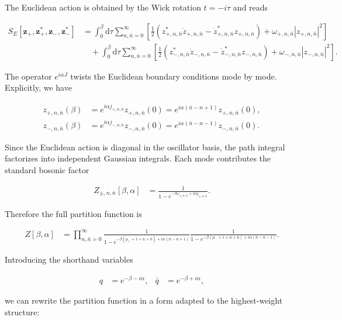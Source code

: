 The Euclidean action is obtained by the Wick rotation $t=-i\tau$ and reads

\begin{align}
S_{E}[\boldsymbol{z}_{+},\boldsymbol{z}^{*}_{+},\boldsymbol{z}_{-},\boldsymbol{z}^{*}_{-}] & =\int ^{\beta}_{0}\mathrm{d}\tau \sum ^{\infty}_{n,\bar{n}=0}\left[\frac{1}{2}\left(z^{*}_{+,n,\bar{n}}\dot{z}_{+,n,\bar{n}}-\dot{z}^{*}_{+,n,\bar{n}}z_{+,n,\bar{n}}\right)+\omega _{+,n,\bar{n}}|z_{+,n,\bar{n}}|^{2}\right] \\
& \quad +\int ^{\beta}_{0}\mathrm{d}\tau \sum ^{\infty}_{n,\bar{n}=0}\left[\frac{1}{2}\left(z^{*}_{-,n,\bar{n}}\dot{z}_{-,n,\bar{n}}-\dot{z}^{*}_{-,n,\bar{n}}z_{-,n,\bar{n}}\right)+\omega _{-,n,\bar{n}}|z_{-,n,\bar{n}}|^{2}\right].
\end{align}

The operator $e^{i\alpha J}$ twists the Euclidean boundary conditions mode by mode. Explicitly, we have

\begin{align}
z_{+,n,\bar{n}}(\beta) & =e^{i\alpha j_{+,n,\bar{n}}}z_{+,n,\bar{n}}(0)=e^{i\alpha (\bar{n}-n+1)}z_{+,n,\bar{n}}(0), \\
z_{-,n,\bar{n}}(\beta) & =e^{i\alpha j_{-,n,\bar{n}}}z_{-,n,\bar{n}}(0)=e^{i\alpha (\bar{n}-n-1)}z_{-,n,\bar{n}}(0).
\end{align}

Since the Euclidean action is diagonal in the oscillator basis, the path integral factorizes into independent Gaussian integrals. Each mode contributes the standard bosonic factor

\begin{align}
Z_{\pm,n,\bar{n}}[\beta,\alpha] & =\frac{1}{1-e^{-\beta \omega _{\pm,n,\bar{n}}+i\alpha j_{\pm,n,\bar{n}}}}.
\end{align}

Therefore the full partition function is

\begin{align}
Z[\beta,\alpha] & =\prod ^{\infty}_{n,\bar{n}=0}\frac{1}{1-e^{-\beta (\mu _{+}+1+n+\bar{n})+i\alpha (\bar{n}-n+1)}}\frac{1}{1-e^{-\beta (\mu _{-}+1+n+\bar{n})+i\alpha (\bar{n}-n-1)}}.
\end{align}

Introducing the shorthand variables

\begin{align}
q & =e^{-\beta-i\alpha}, & \bar{q} & =e^{-\beta+i\alpha},
\end{align}

we can rewrite the partition function in a form adapted to the highest-weight structure:

